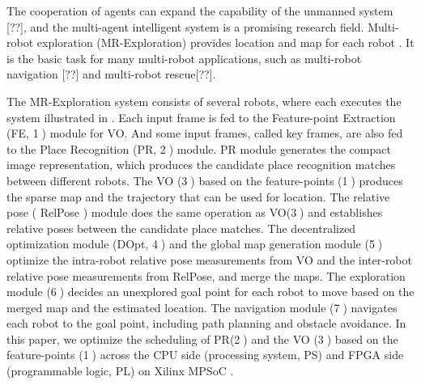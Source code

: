 \label{sec:intro}

The cooperation of agents can expand the capability of the unmanned system [??], and the multi-agent intelligent system is a promising research field.
Multi-robot exploration (MR-Exploration) \cite{corah2019communication} provides location and map for each robot . It is the basic task for many multi-robot applications, such as multi-robot navigation [??] and multi-robot rescue[??].

The  MR-Exploration system \cite{corah2019communication, cieslewski2018data} consists of several robots, where each executes the system illustrated in . Each input frame is fed to the Feature-point Extraction (FE, \textcircled{1}) module for VO. 
And some input frames, called key frames, are also fed to the Place Recognition (PR, \textcircled{2}) module.
PR module generates the compact image representation, which produces the candidate place recognition matches between different robots. The VO (\textcircled{3}) based on the feature-points (\textcircled{1}) produces the sparse map and the trajectory that can be used for location. The relative pose ( RelPose ) module does the same operation as VO(\textcircled{3}) and establishes relative poses between the candidate place matches. The decentralized optimization module (DOpt, \textcircled{4}) and the global map generation module (\textcircled{5}) optimize the intra-robot relative pose measurements from VO and the inter-robot relative pose measurements from RelPose, and merge the maps. The exploration module (\textcircled{6}) decides an unexplored goal point for each robot to move based on the merged map and the estimated location. The navigation module (\textcircled{7}) navigates each robot to the goal point, including path planning and obstacle avoidance.
In this paper, we optimize the scheduling of PR(\textcircled{2}) and the VO (\textcircled{3}) based on the feature-points (\textcircled{1}) across the CPU side (processing system, PS) and FPGA side (programmable logic, PL) on Xilinx MPSoC \cite{MPSoC}.



